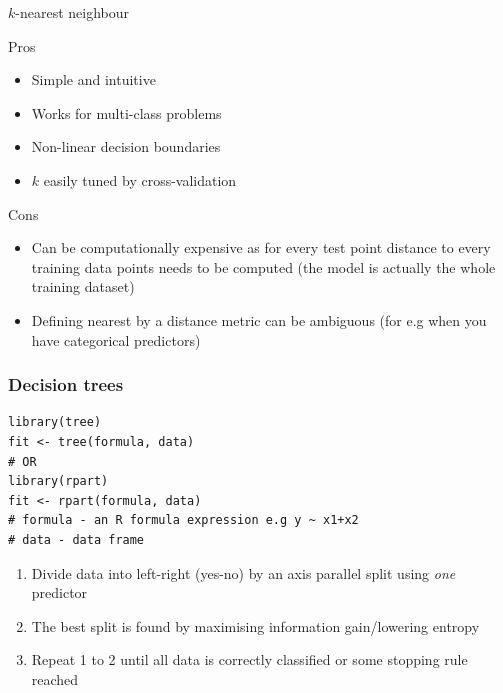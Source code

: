 \documentclass[pdf]{beamer}
\begin{document}
\begin{frame}{$k$-nearest neighbour}
\begin{exampleblock}{Pros}
\begin{itemize}
	\item Simple and intuitive
	\item Works for multi-class problems
	\item Non-linear decision boundaries 
	\item $k$ easily tuned by cross-validation  
\end{itemize}
\end{exampleblock}
\vfill
\begin{alertblock}{Cons}
\begin{itemize}
	\item Can be computationally expensive as for every test point distance to every training data 
	points needs to be computed (the model is actually the whole training dataset) 
	\item Defining nearest by a distance metric can be ambiguous (for e.g when you have categorical predictors)
\end{itemize}
\end{alertblock}
\end{frame}
\begin{frame}[fragile]
\frametitle{Decision trees}
\begin{lstlisting}[style=RCode]
library(tree)
fit <- tree(formula, data)
# OR
library(rpart)
fit <- rpart(formula, data)
# formula - an R formula expression e.g y ~ x1+x2
# data - data frame
\end{lstlisting}
\begin{enumerate}\addtolength{\itemsep}{0.5\baselineskip}
	\item<2-> Divide data into left-right (yes-no) by an axis parallel split using \textit{one} predictor 
	\item<3-> The best split is found by maximising information gain/lowering entropy
	\item<4-> Repeat 1 to 2 until all data is correctly classified or some stopping rule reached
\end{enumerate}
\end{frame}
\end{document}
